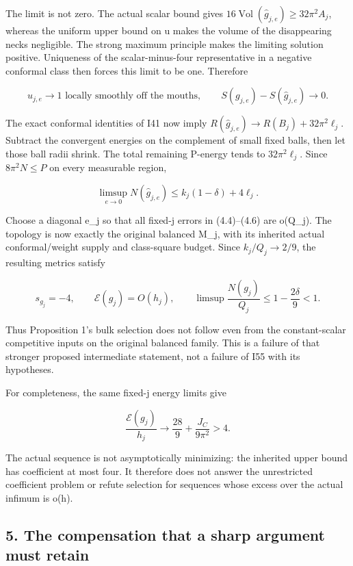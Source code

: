 \documentclass[
  10pt,
]{article}
\begin{document}
The limit is not zero. The actual scalar bound gives
\(16\operatorname{Vol}(\widehat g_{j,e})\ge32\pi^2A_j\), whereas the
uniform upper bound on u makes the volume of the disappearing necks
negligible. The strong maximum principle makes the limiting solution
positive. Uniqueness of the scalar-minus-four representative in a
negative conformal class then forces this limit to be one. Therefore

\[
 u_{j,e}\longrightarrow1\text{ locally smoothly off the mouths},\qquad
 S(g_{j,e})-S(\widehat g_{j,e})\longrightarrow0. \tag{4.5}
\]

The exact conformal identities of I41 now imply
\(R(\widehat g_{j,e})\to R(B_j)+32\pi^2\ell_j\). Subtract the convergent
energies on the complement of small fixed balls, then let those ball
radii shrink. The total remaining P-energy tends to \(32\pi^2\ell_j\).
Since \(8\pi^2N\le P\) on every measurable region,

\[
 \limsup_{e\to0}N(\widehat g_{j,e})
 \le k_j(1-\delta)+4\ell_j. \tag{4.6}
\]

Choose a diagonal e\_j so that all fixed-j errors in (4.4)--(4.6) are
o(Q\_j). The topology is now exactly the original balanced M\_j, with
its inherited actual conformal/weight supply and class-square budget.
Since \(k_j/Q_j\to2/9\), the resulting metrics satisfy

\[
 \boxed{s_{g_j}=-4,\qquad \mathcal E(g_j)=O(h_j),\qquad
 \limsup\frac{N(g_j)}{Q_j}\le1-\frac{2\delta}{9}<1.} \tag{4.7}
\]

Thus Proposition 1's bulk selection does not follow even from the
constant-scalar competitive inputs on the original balanced family. This
is a failure of that stronger proposed intermediate statement, not a
failure of I55 with its hypotheses.

For completeness, the same fixed-j energy limits give

\[
 \frac{\mathcal E(g_j)}{h_j}
 \longrightarrow\frac{28}{9}+\frac{J_C}{9\pi^2}>4. \tag{4.8}
\]

The actual sequence is not asymptotically minimizing: the inherited
upper bound has coefficient at most four. It therefore does not answer
the unrestricted coefficient problem or refute selection for sequences
whose excess over the actual infimum is o(h).

\hypertarget{the-compensation-that-a-sharp-argument-must-retain}{%
\subsection{5. The compensation that a sharp argument must
retain}\label{the-compensation-that-a-sharp-argument-must-retain}}
\end{document}
